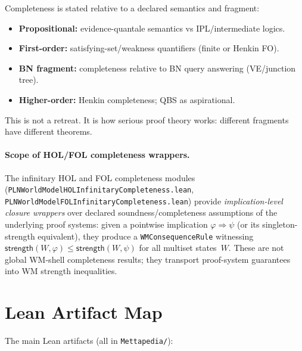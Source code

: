 \documentclass[]{article}
\newcommand{\code}[1]{\texttt{#1}}
\newcommand{\Strength}{\mathsf{strength}}
\begin{document}
Completeness is stated relative to a declared semantics and fragment:
\begin{itemize}[leftmargin=2em]
\item \textbf{Propositional:} evidence-quantale semantics vs
  IPL/intermediate logics.
\item \textbf{First-order:} satisfying-set/weakness quantifiers (finite
  or Henkin FO).
\item \textbf{BN fragment:} completeness relative to BN query answering
  (VE/junction tree).
\item \textbf{Higher-order:} Henkin completeness; QBS as aspirational.
\end{itemize}

This is not a retreat. It is how serious proof theory works: different
fragments have different theorems.

\paragraph{Scope of HOL/FOL completeness wrappers.}
The infinitary HOL and FOL completeness modules
(\code{PLNWorldModelHOLInfinitaryCompleteness.lean},
\code{PLNWorldModelFOLInfinitaryCompleteness.lean}) provide
\emph{implication-level closure wrappers} over declared
soundness/completeness assumptions of the underlying proof systems: given
a pointwise implication $\varphi \Rightarrow \psi$ (or its singleton-strength
equivalent), they produce a \code{WMConsequenceRule} witnessing
$\Strength(W,\varphi) \le \Strength(W,\psi)$ for all multiset states~$W$.
These are not global WM-shell completeness results; they transport
proof-system guarantees into WM strength inequalities.


\section{Lean Artifact Map}
\label{sec:artifacts}

The main Lean artifacts (all in \code{Mettapedia/}):
\end{document}
